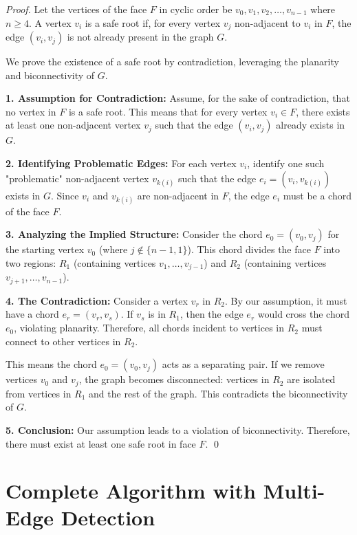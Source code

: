 \documentclass[12pt,a4paper]{article}
\begin{document}
\begin{proof}
Let the vertices of the face $F$ in cyclic order be $v_0, v_1, v_2, \ldots, v_{n-1}$ where $n \geq 4$. A vertex $v_i$ is a safe root if, for every vertex $v_j$ non-adjacent to $v_i$ in $F$, the edge $(v_i, v_j)$ is not already present in the graph $G$.

We prove the existence of a safe root by contradiction, leveraging the planarity and biconnectivity of $G$.

\textbf{1. Assumption for Contradiction:}
Assume, for the sake of contradiction, that no vertex in $F$ is a safe root. This means that for every vertex $v_i \in F$, there exists at least one non-adjacent vertex $v_j$ such that the edge $(v_i, v_j)$ already exists in $G$.

\textbf{2. Identifying Problematic Edges:}
For each vertex $v_i$, identify one such "problematic" non-adjacent vertex $v_{k(i)}$ such that the edge $e_i = (v_i, v_{k(i)})$ exists in $G$. Since $v_i$ and $v_{k(i)}$ are non-adjacent in $F$, the edge $e_i$ must be a chord of the face $F$.

\textbf{3. Analyzing the Implied Structure:}
Consider the chord $e_0 = (v_0, v_j)$ for the starting vertex $v_0$ (where $j \notin \{n-1, 1\}$). This chord divides the face $F$ into two regions: $R_1$ (containing vertices $v_1, \ldots, v_{j-1}$) and $R_2$ (containing vertices $v_{j+1}, \ldots, v_{n-1}$).

\textbf{4. The Contradiction:}
Consider a vertex $v_r$ in $R_2$. By our assumption, it must have a chord $e_r = (v_r, v_s)$. If $v_s$ is in $R_1$, then the edge $e_r$ would cross the chord $e_0$, violating planarity. Therefore, all chords incident to vertices in $R_2$ must connect to other vertices in $R_2$.

This means the chord $e_0 = (v_0, v_j)$ acts as a separating pair. If we remove vertices $v_0$ and $v_j$, the graph becomes disconnected: vertices in $R_2$ are isolated from vertices in $R_1$ and the rest of the graph. This contradicts the biconnectivity of $G$.

\textbf{5. Conclusion:}
Our assumption leads to a violation of biconnectivity. Therefore, there must exist at least one safe root in face $F$. \qed
\end{proof}

\section{Complete Algorithm with Multi-Edge Detection}
\end{document}
